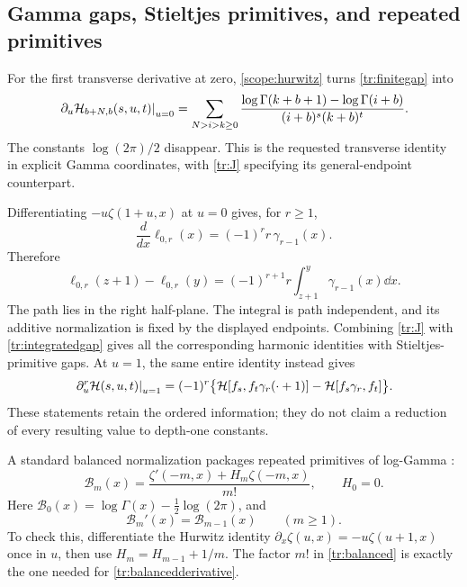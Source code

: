 \subsection{Gamma gaps, Stieltjes primitives, and repeated primitives}

For the first transverse derivative at zero, \eqref{scope:hurwitz}
turns \eqref{tr:finitegap} into
\begin{equation}\label{tr:logGammafinite}
 \left.\partial_u\mathcal H_{b+N,b}(s,u,t)\right|_{u=0}
 =
 \sum_{N>i>k\geq0}
 \frac{\log\Gamma(k+b+1)-\log\Gamma(i+b)}
      {(i+b)^s(k+b)^t}.
\end{equation}
The constants $\log(2\pi)/2$ disappear. This is the requested transverse
identity in explicit Gamma coordinates, with \eqref{tr:J} specifying
its general-endpoint counterpart.

Differentiating $-\!u\zeta(1+u,x)$ at $u=0$ gives, for $r\geq1$,
\begin{equation}\label{tr:Stieltjesprimitive}
 \frac{d}{dx}\ell_{0,r}(x)=(-1)^r r\,\gamma_{r-1}(x).
\end{equation}
Therefore
\begin{equation}\label{tr:integratedgap}
 \ell_{0,r}(z+1)-\ell_{0,r}(y)
   =(-1)^{r+1}r\int_{z+1}^{y}\gamma_{r-1}(x)\dd x.
\end{equation}
The path lies in the right half-plane. The integral is path independent,
and its additive normalization is fixed by the displayed endpoints.
Combining \eqref{tr:J} with \eqref{tr:integratedgap} gives all the
corresponding harmonic identities with Stieltjes-primitive gaps.
At $u=1$, the same entire identity instead gives
\begin{align}
 \left.\partial_u^r\mathcal H(s,u,t)\right|_{u=1}
 =(-1)^r\bigl\{\mathcal H[f_s,f_t\gamma_r(\cdot+1)]
                 -\mathcal H[f_s\gamma_r,f_t]\bigr\}.
 \label{tr:Stieltjesgap}
\end{align}
These statements retain the ordered information; they do not claim
a reduction of every resulting value to depth-one constants.

A standard balanced normalization packages repeated primitives of
log-Gamma \cite{EspinosaMoll}:
\begin{equation}\label{tr:balanced}
 \mathcal B_m(x)=
       \frac{\zeta'(-m,x)+H_m\zeta(-m,x)}{m!},\qquad H_0=0.
\end{equation}
Here $\mathcal B_0(x)=\log\Gamma(x)-\tfrac12\log(2\pi)$, and
\begin{equation}\label{tr:balancedderivative}
 \mathcal B_m'(x)=\mathcal B_{m-1}(x)\qquad(m\geq1).
\end{equation}
To check this, differentiate the Hurwitz identity
$\partial_x\zeta(u,x)=-u\zeta(u+1,x)$ once in $u$, then use
$H_m=H_{m-1}+1/m$. The factor $m!$ in \eqref{tr:balanced} is
exactly the one needed for \eqref{tr:balancedderivative}.

